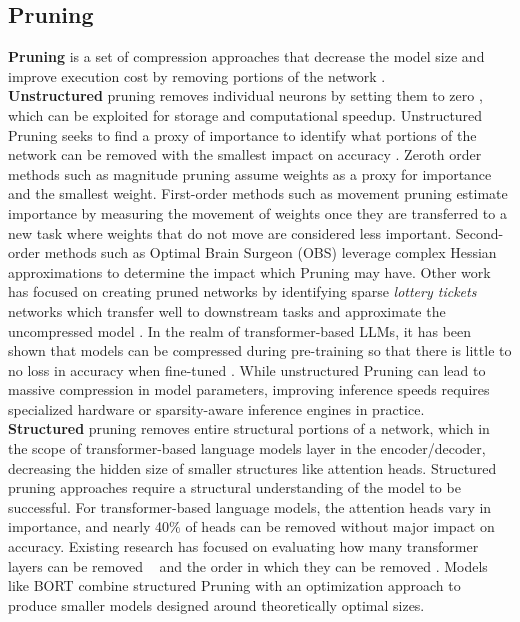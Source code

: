 \subsection{Pruning}
\noindent\textbf{Pruning} is a set of compression approaches that decrease the model size and improve execution cost by removing portions of the network \cite{LeCun1989OptimalBD}. \\
\textbf{Unstructured} pruning removes individual neurons by setting them to zero \cite{Han2015ADN}, which can be exploited for storage and computational speedup. Unstructured Pruning seeks to find a proxy of importance to identify what portions of the network can be removed with the smallest impact on accuracy \cite{LeCun1989OptimalBD}. Zeroth order methods such as magnitude pruning \cite{Han2015ADN, Gale2019TheSO} assume weights as a proxy for importance and the smallest weight. First-order methods such as movement pruning \cite{Sanh2020MovementPA} estimate importance by measuring the movement of weights once they are transferred to a new task where weights that do not move are considered less important. Second-order \cite{LeCun1989OptimalBD, hassibi1993second, Singh2020WoodFisherES} methods such as Optimal Brain Surgeon (OBS) leverage complex Hessian approximations to determine the impact which Pruning may have. Other work has focused on creating pruned networks by identifying sparse \textit{lottery tickets} networks which transfer well to downstream tasks and approximate the uncompressed model \cite{Chen2020TheLT, Frankle2019TheLT}. In the realm of transformer-based LLMs, it has been shown that models can be compressed during pre-training so that there is little to no loss in accuracy when fine-tuned \cite{zafrir2021prune}. While unstructured Pruning can lead to massive compression in model parameters, improving inference speeds requires specialized hardware or sparsity-aware inference engines in practice. \\
\textbf{Structured} pruning \cite{LeCun1989OptimalBD} removes entire structural portions of a network, which in the scope of transformer-based language models layer in the encoder/decoder, decreasing the hidden size of smaller structures like attention heads. Structured pruning approaches require a structural understanding of the model to be successful. For transformer-based language models, the attention heads vary in importance, and nearly 40\% of heads can be removed without major impact on accuracy\cite{Michel2019AreSH,Voita2019AnalyzingMS}. Existing research has focused on evaluating how many transformer layers can be removed ~\cite{Sridhar2020UndividedAA} and the order in which they can be removed \cite{DBLP:journals/corr/abs-2004-03844}. Models like BORT \cite{DBLP:journals/corr/abs-2010-10499} combine structured Pruning with an optimization approach to produce smaller models designed around theoretically optimal sizes.\\

